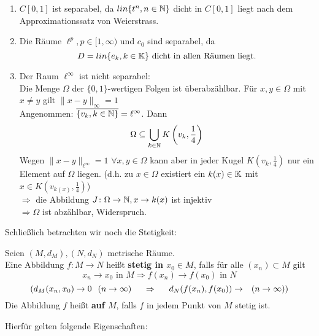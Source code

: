 \begin{beispiel}
\begin{enumerate}[label=\alph*\upshape)]
\begin{beweis}
			\end{beweis}
		\item $C[0, 1]$ ist separabel, da $ lin \{ t^{n}, n \in \mathbb{N} \} $ dicht in $C[0, 1]$ liegt nach dem Approximationssatz von Weierstrass.
		\item Die Räume $\ell^{p}, p \in [1, \infty)$ und $c_{0}$ sind separabel, da
			\[ D = lin \{ e_{k}, k \in \mathbb{K} \} \text{ dicht in allen Räumen liegt.} \]
		\item Der Raum $\ell^{\infty}$ ist nicht separabel: \\
			Die Menge $\Omega$ der $\{0, 1\}$-wertigen Folgen ist überabzählbar. Für $x, y \in \Omega$ mit $x \neq y$ gilt $\| x - y \|_{\infty} = 1$ \\
			Angenommen: $\overline{ \{v_{k}, k \in \mathbb{N} \} } = \ell^{\infty}$. Dann
			\[ \Omega \subseteq \bigcup_{k \in \mathbb{N}} K \left( v_{k}, \frac{1}{4} \right) \]
			Wegen $\| x - y\|_{\ell^{\infty}} = 1$ $\forall x, y \in \Omega$ kann aber in jeder Kugel $K(v_{k}, \frac{1}{4})$ nur ein Element auf $\Omega$ liegen. 
			(d.h. zu $x \in \Omega$ existiert ein $k(x) \in \mathbb{K}$ mit $x \in K(v_{k(x)}, \frac{1}{4})$) \\
			$\Rightarrow$ die Abbildung $ J \colon \Omega \rightarrow \mathbb{N}, x \rightarrow k(x)$ ist injektiv \\
			$\Rightarrow \Omega$ ist abzählbar, Widerspruch.
	\end{enumerate}
\end{beispiel}


Schlie{\ss}lich betrachten wir noch die Stetigkeit:


\begin{definition}
	Seien $(M, d_{M}), (N, d_{N})$ metrische Räume. \\
	Eine Abbildung $f \colon M \rightarrow N$ hei{\ss}t \textbf{stetig in $x_{0} \in M$}, falls für alle $(x_{n}) \subset M$ gilt
	\[ x_{n} \rightarrow x_{0} \text{ in } M \Rightarrow f(x_{n}) \rightarrow f(x_{0}) \text{ in } N \]
	\[ (d_{M}(x_{n}, x_{0}) \rightarrow 0 \hspace{0.25cm} (n \rightarrow \infty) \hspace{0.5cm} \Rightarrow \hspace{0.5cm} d_{N}(f(x_{n}), f(x_{0})) \rightarrow \hspace{0.25cm} (n \rightarrow \infty)) \]
	Die Abbildung $f$ hei{\ss}t  \textbf{auf $M$}, falls $f$ in jedem Punkt von $M$ stetig ist.
\end{definition}


Hierfür gelten folgende Eigenschaften:


